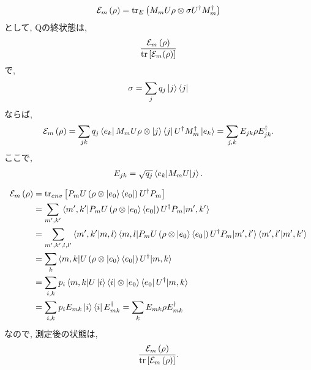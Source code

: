 \begin{ex}
    \label{ex8.7}
    \begin{align*}
        \mathcal{E}_m \left( \rho \right)
        =
        \mathrm{tr}_E \left( M_m U \rho \otimes \sigma U^\dagger M_m^\dagger \right)
    \end{align*}
    として, Qの終状態は,
    \begin{align*}
        \frac{\mathcal{E}_m \left( \rho \right)}{\mathrm{tr} \left[ \mathcal{E}_m(\rho)\right]}
    \end{align*}
    で,
    \begin{align*}
        \sigma = \sum_j q_j \ket{j}\bra{j}
    \end{align*}
    ならば,
    \begin{align*}
        \mathcal{E}_m \left( \rho \right)
        =
        \sum_{jk} q_j \bra{e_k} M_m U \rho \otimes \ket{j}\bra{j} U^\dagger M_m^\dagger \ket{e_k}
        =
        \sum_{j,k}E_{jk} \rho E_{jk}^\dagger.
    \end{align*}
    ここで,
    \begin{align*}
        E_{jk} = \sqrt{q_j} \braket{e_k | M_m U | j}.
    \end{align*}
\end{ex}

\begin{ex}
    \label{ex8.8}
\end{ex}

\begin{ex}
    \label{ex8.9}
    \begin{align*}
        \mathcal{E}_m \left( \rho \right)
         & = \mathrm{tr}_{env} \left[ P_m U \left(\rho \otimes \ket{e_0} \bra{e_0} \right) U^\dagger P_m\right] \\
         & =
        \sum_{m',k'}
        \braket{
            m', k'
            |P_m U \left(\rho \otimes \ket{e_0} \bra{e_0} \right) U^\dagger P_m|
            m', k'
        }
        \\
         & =
        \sum_{m',k',l,l'}
        \braket{m', k'|m,l}
        \braket{
            m,l
            |P_m U \left(\rho \otimes \ket{e_0} \bra{e_0} \right) U^\dagger P_m|
            m', l'
        }
        \braket{m', l'|m',k'}
        \\
         & =
        \sum_{k}
        \braket{
            m,k
            |U \left(\rho \otimes \ket{e_0} \bra{e_0} \right) U^\dagger |
            m, k
        }
        \\
         & =
        \sum_{i,k}
        p_i
        \braket{
            m,k
            |U \ket{i}\bra{i} \otimes \ket{e_0}\bra{e_0} U^\dagger |
            m, k
        }
        \\
         & =
        \sum_{i,k}
        p_i
        E_{mk} \ket{i}
        \bra{i} E_{mk}^\dagger
        =
        \sum_{k}
        E_{mk} \rho E_{mk}^\dagger
    \end{align*}
    なので, 測定後の状態は,
    \begin{align*}
        \frac{\mathcal{E}_m \left(\rho\right)}
        {\mathrm{tr}\left[ \mathcal{E}_m\left(\rho\right)\right]}.
    \end{align*}
\end{ex}


